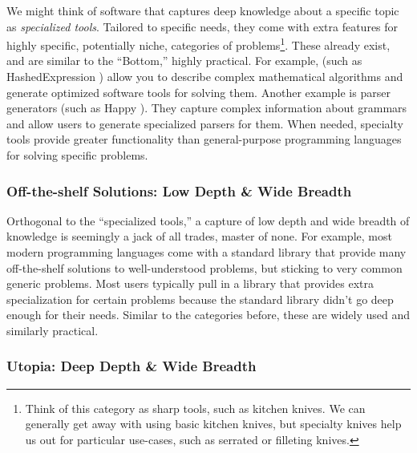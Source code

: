 We might think of software that captures deep knowledge about a specific topic
as \textit{specialized tools}. Tailored to specific needs, they come with extra
features for highly specific, potentially niche, categories of
problems\footnote{Think of this category as sharp tools, such as kitchen knives.
We can generally get away with using basic kitchen knives, but specialty knives
help us out for particular use-cases, such as serrated  or filleting
knives.}. These already exist, and are similar to the ``Bottom,'' highly
practical. For example,  (such as HashedExpression
\cite{HashedExpression}) allow you to describe complex mathematical algorithms
and generate optimized software tools for solving them. Another example is
parser generators (such as Happy \cite{Happy}). They capture complex information
about grammars and allow users to generate specialized parsers for them. When
needed, specialty tools provide greater functionality than general-purpose
programming languages for solving specific problems.

\subsubsection{Off-the-shelf Solutions: Low Depth \& Wide Breadth}
\label{chap:ideology:sec:thoughts_of_generation:subsec:feasibility:subsubsec:modelling}

Orthogonal to the ``specialized tools,'' a capture of low depth and wide breadth
of knowledge is seemingly a jack of all trades, master of none. For example,
most modern programming languages come with a standard library that provide many
off-the-shelf solutions to well-understood problems, but sticking to very common
generic problems. Most users typically pull in a library that provides extra
specialization for certain problems because the standard library didn't go deep
enough for their needs. Similar to the categories before, these are widely used
and similarly practical.

\subsubsection{Utopia: Deep Depth \& Wide Breadth}
\label{chap:ideology:sec:thoughts_of_generation:subsec:feasibility:subsubsec:utopia}

